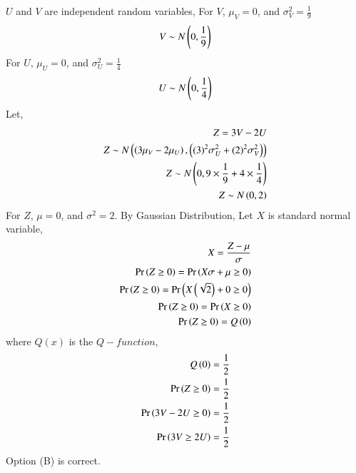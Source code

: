 
$U$ and $V$ are independent random variables,
For $V$, $\mu_V=0$, and $\sigma_V^2=\frac{1}{9}$
\begin{align}
    V\sim N\left(0,\frac{1}{9}\right)
\end{align}
For $U$, $\mu_U=0$, and $\sigma_U^2=\frac{1}{4}$
\begin{align}
    U\sim N\left(0,\frac{1}{4}\right)
\end{align}
Let,
\begin{align}
    Z=3V-2U\\
    Z\sim N\left(\left(3\mu_V-2\mu_U\right), \left((3)^2\sigma_U^2+(2)^2\sigma_V^2\right)\right)\\
    Z\sim N\left(0,9\times\frac{1}{9}+4\times\frac{1}{4}\right)\\
    Z\sim N\left(0,2\right)
\end{align}
For $Z$, $\mu=0$, and $\sigma^2=2$.
By Gaussian Distribution,
Let $X$ is standard normal variable,
\begin{align}
    X=\frac{Z-\mu}{\sigma}\\
    \Pr\left(Z\geq0\right)=\Pr\left(X\sigma+\mu\geq0\right)\\
    \Pr\left(Z\geq0\right)=\Pr\left(X\left(\sqrt{2}\right)+0\geq0\right)\\
    \Pr\left(Z\geq0\right)=\Pr\left(X\geq0\right)\\
    \Pr\left(Z\geq0\right)=Q\left(0\right)
\end{align}
where $Q(x)$ is the $Q-function$,
\begin{align}
    Q\left(0\right)=\frac{1}{2}\\
    \Pr\left(Z\geq0\right)=\frac{1}{2}\\
    \Pr\left(3V-2U\geq0\right)=\frac{1}{2}\\
    \Pr\left(3V\geq2U\right)=\frac{1}{2}
\end{align}
Option (B) is correct.